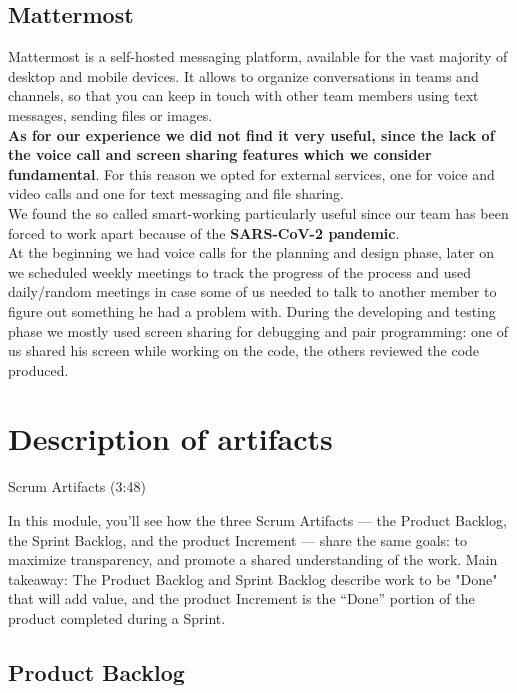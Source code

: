 \documentclass[a4paper,10pt]{report}
\begin{document}
\section[Mattermost] {Mattermost}
Mattermost is a self-hosted messaging platform, available for the vast majority of desktop and mobile devices. It allows to organize conversations in teams and channels, so that you can keep in touch with other team members using text messages, sending files or images. \\
\textbf{As for our experience we did not find it very useful, since the lack of the voice call and screen sharing features which we consider fundamental}. For this reason we opted for external services, one for voice and video calls and one for text messaging and file sharing.\\
We found the so called smart-working particularly useful since our team has been forced to work apart because of the \textbf{SARS-CoV-2 pandemic}. \\
At the beginning we had voice calls for the planning and design phase, later on we scheduled weekly meetings to track the progress of the process and used daily/random meetings in case some of us needed to talk to another member to figure out something he had a problem with.
During the developing and testing phase we mostly used screen sharing for debugging and pair programming: one of us shared his screen while working on the code, the others reviewed the code produced.
\chapter{Description of artifacts}
Scrum Artifacts (3:48)

In this module, you’ll see how the three Scrum Artifacts — the Product Backlog, the Sprint Backlog, and the product Increment — share the same goals: to maximize transparency, and promote a shared understanding of the work. Main takeaway: The Product Backlog and Sprint Backlog describe work to be "Done" that will add value, and the product Increment is the “Done” portion of the product completed during a Sprint.
\section{Product Backlog}
\end{document}

